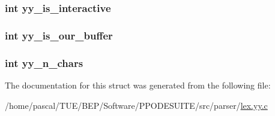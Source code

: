 \hypertarget{structyy__buffer__state_a2a823a361fbbe1af51a957d0d0cbf4e2}{
\subsubsection[{yy\-\_\-is\-\_\-interactive}]{\setlength{\rightskip}{0pt plus 5cm}int yy\-\_\-is\-\_\-interactive}}\label{structyy__buffer__state_a2a823a361fbbe1af51a957d0d0cbf4e2}
\hypertarget{structyy__buffer__state_a1e64bbdc1343d886bee3af97e19644bc}{
\subsubsection[{yy\-\_\-is\-\_\-our\-\_\-buffer}]{\setlength{\rightskip}{0pt plus 5cm}int yy\-\_\-is\-\_\-our\-\_\-buffer}}\label{structyy__buffer__state_a1e64bbdc1343d886bee3af97e19644bc}
\hypertarget{structyy__buffer__state_aa86c122f2050dbfd365fcf547e6fc1c3}{
\subsubsection[{yy\-\_\-n\-\_\-chars}]{\setlength{\rightskip}{0pt plus 5cm}int yy\-\_\-n\-\_\-chars}}\label{structyy__buffer__state_aa86c122f2050dbfd365fcf547e6fc1c3}


The documentation for this struct was generated from the following file\-:\begin{DoxyCompactItemize}
\item 
/home/pascal/\-T\-U\-E/\-B\-E\-P/\-Software/\-P\-P\-O\-D\-E\-S\-U\-I\-T\-E/src/parser/\hyperlink{lex_8yy_8c}{lex.\-yy.\-c}\end{DoxyCompactItemize}
